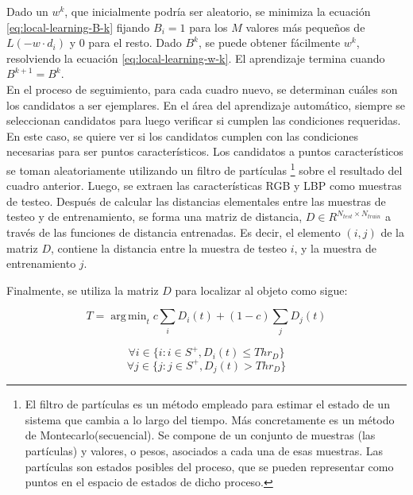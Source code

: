 \documentclass[a4paper,10pt]{article}
\DeclareMathOperator*{\argmin}{arg\,min}
\begin{document}
Dado un $w^{k}$, que inicialmente podría ser aleatorio, se minimiza la ecuación
\ref{eq:local-learning-B-k} fijando $B_{i} = 1$ para los $M$ valores más
pequeños de $L(-w \cdot d_{i})$ y $0$ para el resto. Dado $B^{k}$, se puede
obtener fácilmente $w^{k}$, resolviendo la ecuación \ref{eq:local-learning-w-k}.
El aprendizaje termina cuando $B^{k+1}=B^{k}$.\\

En el proceso de seguimiento, para cada cuadro nuevo, se determinan cuáles son los candidatos
a ser ejemplares. En el área del aprendizaje automático, siempre se seleccionan
candidatos para luego verificar si cumplen las condiciones requeridas. En este
caso, se quiere ver si los candidatos cumplen con las condiciones necesarias
para ser puntos característicos. Los candidatos a puntos característicos se
toman aleatoriamente utilizando un filtro de partículas
\footnote{El filtro de partículas es un método empleado para estimar el estado
  de un sistema que cambia a lo largo del tiempo. Más concretamente es un
  método de Montecarlo(secuencial). Se compone de un conjunto de muestras (las
  partículas) y valores, o pesos, asociados a cada una de esas muestras.
  Las partículas son estados posibles del proceso, que se pueden representar
  como puntos en el espacio de estados de dicho proceso.}
sobre el resultado del cuadro anterior. Luego, se extraen las características
RGB y LBP como muestras de testeo. Después de calcular las distancias
elementales entre las muestras de testeo y de entrenamiento, se forma una
matriz de distancia, $D \in R^{N_{test} \times N_{train}}$ a través de las
funciones de distancia entrenadas. Es decir, el elemento $(i,j)$ de la matriz
$D$, contiene la distancia entre la muestra de testeo $i$, y la muestra de
entrenamiento $j$.

Finalmente, se utiliza la matriz $D$ para localizar al objeto como sigue:

\begin{equation}
    T = \argmin_{t} c \sum_{i} D_{i}(t) + (1 - c) \sum_{j} D_{j}(t)
\end{equation}

\begin{equation}
    \forall i \in \{i : i \in S^{+}, D_{i}(t) \leq Thr_{D} \}
\end{equation}
\begin{equation}
    \forall j \in \{j : j \in S^{+}, D_{j}(t) > Thr_{D} \}
\end{equation}
\end{document}
